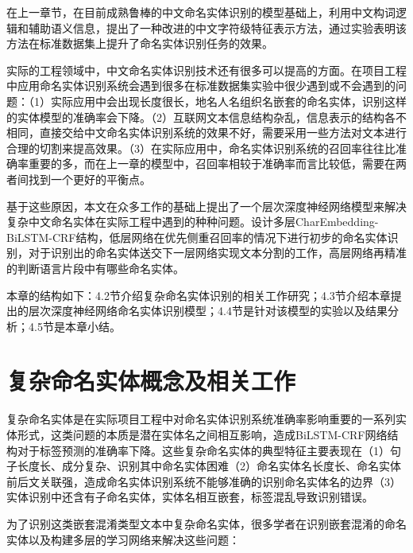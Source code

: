 \documentclass[winfonts,master,oneside,nobackinfo]{njuthesis}
\begin{document}
在上一章节，在目前成熟鲁棒的中文命名实体识别的模型基础上，利用中文构词逻辑和辅助语义信息，提出了一种改进的中文字符级特征表示方法，通过实验表明该方法在标准数据集上提升了命名实体识别任务的效果。

实际的工程领域中，中文命名实体识别技术还有很多可以提高的方面。在项目工程中应用命名实体识别系统会遇到很多在标准数据集实验中很少遇到或不会遇到的问题：（1）实际应用中会出现长度很长，地名人名组织名嵌套的命名实体，识别这样的实体模型的准确率会下降。（2）互联网文本信息结构杂乱，信息表示的结构各不相同，直接交给中文命名实体识别系统的效果不好，需要采用一些方法对文本进行合理的切割来提高效果。（3）在实际应用中，命名实体识别系统的召回率往往比准确率重要的多，而在上一章的模型中，召回率相较于准确率而言比较低，需要在两者间找到一个更好的平衡点。

基于这些原因，本文在众多工作的基础上提出了一个层次深度神经网络模型来解决复杂中文命名实体在实际工程中遇到的种种问题。设计多层CharEmbedding-BiLSTM-CRF结构，低层网络在优先侧重召回率的情况下进行初步的命名实体识别，对于识别出的命名实体送交下一层网络实现文本分割的工作，高层网络再精准的判断语言片段中有哪些命名实体。

本章的结构如下：4.2节介绍复杂命名实体识别的相关工作研究；4.3节介绍本章提出的层次深度神经网络命名实体识别模型；4.4节是针对该模型的实验以及结果分析；4.5节是本章小结。





\section{复杂命名实体概念及相关工作}

复杂命名实体是在实际项目工程中对命名实体识别系统准确率影响重要的一系列实体形式，这类问题的本质是潜在实体名之间相互影响，造成BiLSTM-CRF网络结构对于标签预测的准确率下降。这些复杂命名实体的典型特征主要表现在（1）句子长度长、成分复杂、识别其中命名实体困难（2）命名实体名长度长、命名实体前后文关联强，造成命名实体识别系统不能够准确的识别命名实体名的边界（3）实体识别中还含有子命名实体，实体名相互嵌套，标签混乱导致识别错误。

为了识别这类嵌套混淆类型文本中复杂命名实体，很多学者在识别嵌套混淆的命名实体以及构建多层的学习网络来解决这些问题：
\end{document}
